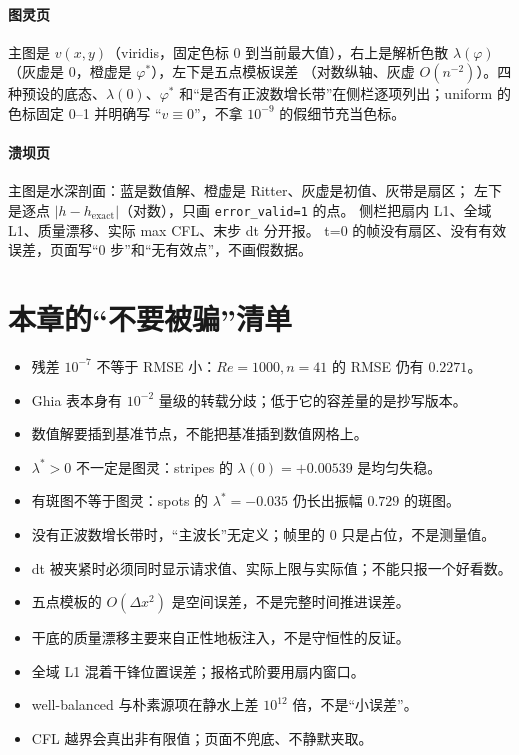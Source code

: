 \paragraph{图灵页}
主图是 $v(x,y)$（viridis，固定色标 0 到当前最大值），右上是解析色散
$\lambda(\varphi)$（灰虚是 0，橙虚是 $\varphi^\ast$），左下是五点模板误差
（对数纵轴、灰虚 $O(n^{-2})$）。四种预设的底态、$\lambda(0)$、$\varphi^\ast$
和“是否有正波数增长带”在侧栏逐项列出；uniform 的色标固定 0--1 并明确写
“$v\equiv0$”，不拿 $10^{-9}$ 的假细节充当色标。

\paragraph{溃坝页}
主图是水深剖面：蓝是数值解、橙虚是 Ritter、灰虚是初值、灰带是扇区；
左下是逐点 $|h-h_{\text{exact}}|$（对数），只画 \texttt{error\_valid=1} 的点。
侧栏把扇内 L1、全域 L1、质量漂移、实际 max CFL、末步 dt 分开报。
t=0 的帧没有扇区、没有有效误差，页面写“0 步”和“无有效点”，不画假数据。

\section{本章的“不要被骗”清单}

\begin{itemize}
  \item 残差 $10^{-7}$ 不等于 RMSE 小：$Re=1000,n=41$ 的 RMSE 仍有 $0.2271$。
  \item Ghia 表本身有 $10^{-2}$ 量级的转载分歧；低于它的容差量的是抄写版本。
  \item 数值解要插到基准节点，不能把基准插到数值网格上。
  \item $\lambda^\ast>0$ 不一定是图灵：stripes 的 $\lambda(0)=+0.00539$ 是均匀失稳。
  \item 有斑图不等于图灵：spots 的 $\lambda^\ast=-0.035$ 仍长出振幅 $0.729$ 的斑图。
  \item 没有正波数增长带时，“主波长”无定义；帧里的 0 只是占位，不是测量值。
  \item dt 被夹紧时必须同时显示请求值、实际上限与实际值；不能只报一个好看数。
  \item 五点模板的 $O(\Delta x^2)$ 是空间误差，不是完整时间推进误差。
  \item 干底的质量漂移主要来自正性地板注入，不是守恒性的反证。
  \item 全域 L1 混着干锋位置误差；报格式阶要用扇内窗口。
  \item well-balanced 与朴素源项在静水上差 $10^{12}$ 倍，不是“小误差”。
  \item CFL 越界会真出非有限值；页面不兜底、不静默夹取。
\end{itemize}


